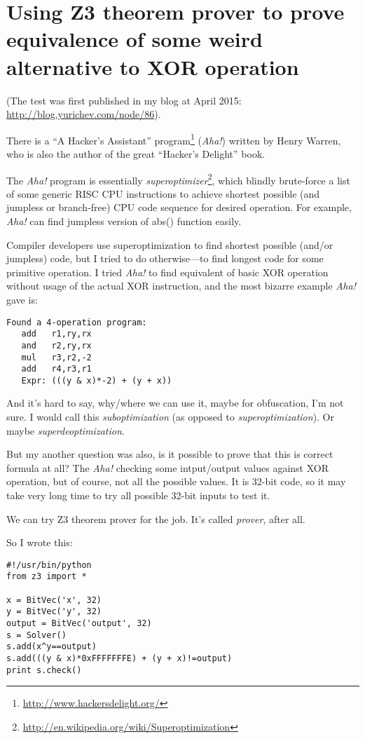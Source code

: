 \section{Using Z3 theorem prover to prove equivalence of some weird alternative to XOR operation}
\label{weird_XOR}

(The test was first published in my blog at April 2015: \url{http://blog.yurichev.com/node/86}).

There is a ``A Hacker's Assistant'' program\footnote{\url{http://www.hackersdelight.org/}} (\textit{Aha!}) written by Henry Warren,
who is also the author of the great ``Hacker's Delight'' book.

The \textit{Aha!} program is essentially \textit{superoptimizer}\footnote{\url{http://en.wikipedia.org/wiki/Superoptimization}},
which blindly brute-force a list of some generic RISC CPU instructions to achieve shortest possible (and jumpless or branch-free) 
CPU code sequence for desired operation.
For example, \textit{Aha!} can find jumpless version of abs() function easily.

Compiler developers use superoptimization to find shortest possible (and/or jumpless) code,
but I tried to do otherwise---to find longest code for some primitive operation.
I tried \textit{Aha!} to find equivalent of basic XOR operation without usage of the actual XOR instruction,
and the most bizarre example \textit{Aha!} gave is:

\begin{lstlisting}
Found a 4-operation program:
   add   r1,ry,rx
   and   r2,ry,rx
   mul   r3,r2,-2
   add   r4,r3,r1
   Expr: (((y & x)*-2) + (y + x))
\end{lstlisting}

And it's hard to say, why/where we can use it, maybe for obfuscation, I'm not sure.
I would call this \textit{suboptimization} (as opposed to \textit{superoptimization}).
Or maybe \textit{superdeoptimization}.

But my another question was also, is it possible to prove that this is correct formula at all?
The \textit{Aha!} checking some intput/output values against XOR operation, but of course, not all the possible values.
It is 32-bit code, so it may take very long time to try all possible 32-bit inputs to test it.

We can try Z3 theorem prover for the job. It's called \textit{prover}, after all.

So I wrote this:

\begin{lstlisting}
#!/usr/bin/python
from z3 import *

x = BitVec('x', 32)
y = BitVec('y', 32)
output = BitVec('output', 32)
s = Solver()
s.add(x^y==output)
s.add(((y & x)*0xFFFFFFFE) + (y + x)!=output)
print s.check()
\end{lstlisting}

